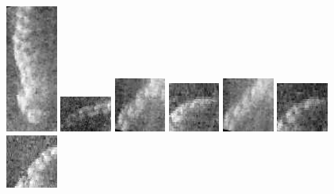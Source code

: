 \begin{figure}
    \includegraphics[width=0.15\textwidth]{chapters/images/dataset/all-class-images/chain/chain-56.jpg}    
    \includegraphics[width=0.15\textwidth]{chapters/images/dataset/all-class-images/chain/chain-194.jpg}
    \includegraphics[width=0.15\textwidth]{chapters/images/dataset/all-class-images/chain/chain-58.jpg}
    \includegraphics[width=0.15\textwidth]{chapters/images/dataset/all-class-images/chain/chain-151.jpg}
    \includegraphics[width=0.15\textwidth]{chapters/images/dataset/all-class-images/chain/chain-59.jpg}
    \includegraphics[width=0.15\textwidth]{chapters/images/dataset/all-class-images/chain/chain-155.jpg}
    \includegraphics[width=0.15\textwidth]{chapters/images/dataset/all-class-images/chain/chain-93.jpg}

\end{figure}

